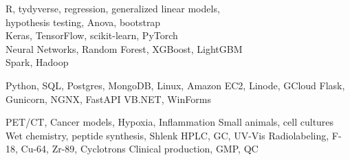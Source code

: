\documentclass[9pt]{developercv} %
\begin{document}
\vspace{0.5cm}


\begin{minipage}[t]{0.33\textwidth} %
	\vspace{-\baselineskip} %
	
	R, tydyverse, regression, generalized linear models,\\
	hypothesis testing, Anova, bootstrap\\
	Keras, TensorFlow, scikit-learn, PyTorch\\
	Neural Networks, Random Forest, XGBoost, LightGBM\\
	Spark, Hadoop
\end{minipage}
\hspace{0.005\textwidth}
\begin{minipage}[t]{0.33\textwidth} %
	\vspace{-\baselineskip} %
	
	Python, SQL, Postgres, MongoDB, 
	Linux, Amazon EC2, Linode, GCloud
	Flask, Gunicorn, NGNX, FastAPI
	VB.NET, WinForms 
\end{minipage}
\hspace{0.005\textwidth}
\begin{minipage}[t]{0.33\textwidth} %
	\vspace{-\baselineskip} %
	
	PET/CT, Cancer models, Hypoxia, Inflammation
	Small animals, cell cultures
	Wet chemistry, peptide synthesis, Shlenk
	HPLC, GC, UV-Vis
	Radiolabeling, F-18, Cu-64, Zr-89, Cyclotrons
	Clinical production, GMP, QC
\end{minipage}


\end{document}
